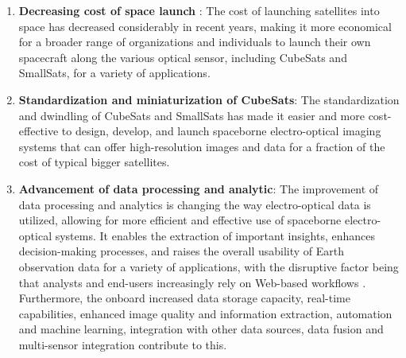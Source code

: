 \documentclass[final,5p,times,twocolumn]{elsarticle}
\begin{document}
\begin{enumerate}
	\item \textbf{Decreasing cost of space launch }: The cost of launching satellites into space has decreased considerably in recent years, making it more economical for a broader range of organizations and individuals to launch their own spacecraft along the various optical sensor, including CubeSats and SmallSats, for a variety of applications.
	\item \textbf{Standardization and miniaturization of CubeSats}: The standardization and dwindling of CubeSats and SmallSats has made it easier and more cost-effective to design, develop, and launch spaceborne electro-optical imaging systems that can offer high-resolution images and data for a fraction of the cost of typical bigger satellites.
	\item \textbf{Advancement of data processing and analytic}: The improvement of data processing and analytics is changing the way electro-optical data is utilized, allowing for more efficient and effective use of spaceborne electro-optical systems. It enables the extraction of important insights, enhances decision-making processes, and raises the overall usability of Earth observation data for a variety of applications, with the disruptive factor being that analysts and end-users increasingly rely on Web-based workflows \citep{sudmanns2020big}.  Furthermore, the onboard increased data storage capacity, real-time capabilities, enhanced image quality and information extraction, automation and machine learning, integration with other data sources, data fusion and multi-sensor integration contribute to this.
\end{enumerate}
\end{document}
